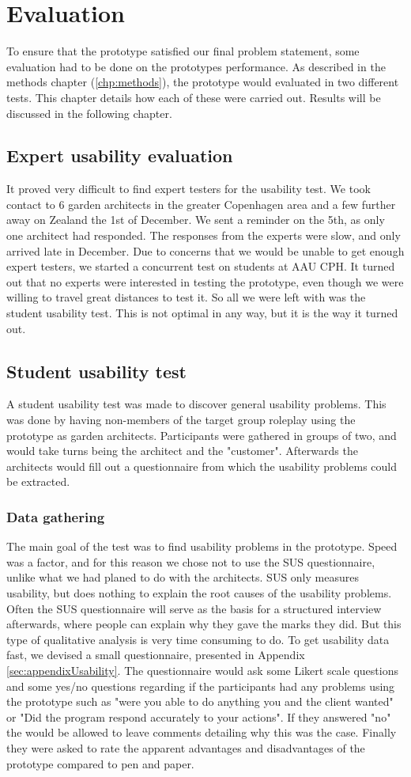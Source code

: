 \chapter{Evaluation}
To ensure that the prototype satisfied our final problem statement, some evaluation had to be done on the prototypes performance. As described in the methods chapter (\ref{chp:methods}), the prototype would evaluated in two different tests. This chapter details how each of these were carried out. Results will be discussed in the following chapter.

\section{Expert usability evaluation}
It proved very difficult to find expert testers for the usability test. We took contact to 6 garden architects in the greater Copenhagen area and a few further away on Zealand the 1st of December. We sent a reminder on the 5th, as only one architect had responded. The responses from the experts were slow, and only arrived late in December. Due to concerns that we would be unable to get enough expert testers, we started a concurrent test on students at AAU CPH. It turned out that no experts were interested in testing the prototype, even though we were willing to travel great distances to test it. So all we were left with was the student usability test. This is not optimal in any way, but it is the way it turned out.
\section{Student usability test}
A student usability test was made to discover general usability problems. This was done by having non-members of the target group roleplay using the prototype as garden architects. Participants were gathered in groups of two, and would take turns being the architect and the "customer". Afterwards the architects would fill out a questionnaire from which the usability problems could be extracted. 
\subsection{Data gathering}
The main goal of the test was to find usability problems in the prototype. Speed was a factor, and for this reason we chose not to use the SUS questionnaire, unlike what we had planed to do with the architects. SUS only measures usability, but does nothing to explain the root causes of the usability problems. Often the SUS questionnaire will serve as the basis for a structured interview afterwards, where people can explain why they gave the marks they did. But this type of qualitative analysis is very time consuming to do. To get usability data fast, we devised a small questionnaire, presented in Appendix \ref{sec:appendixUsability}. The questionnaire would ask some Likert scale questions and some yes/no questions regarding if the participants had any problems using the prototype such as "were you able to do anything you and the client wanted" or "Did the program respond accurately to your actions". If they answered "no" the would be allowed to leave comments detailing why this was the case. Finally they were asked to rate the apparent advantages and disadvantages of the prototype compared to pen and paper.

